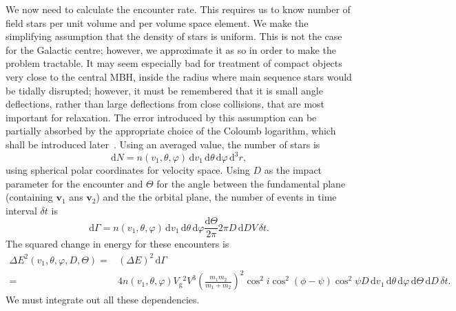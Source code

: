 \documentclass[useAMS,usedcolumn,usegraphicx,usenatbib]{mn2e}
\newcommand{\sub}[1]{\ensuremath{_\mathrm{#1}}}
\newcommand{\dd}{\ensuremath{\mathrm{d}}}
\begin{document}
\begin{onecolumn}
We now need to calculate the encounter rate. This requires us to know number of field stars per unit volume and per volume space element. We make the simplifying assumption that the density of stars is uniform. This is not the case for the Galactic centre; however, we approximate it as so in order to make the problem tractable. It may seem especially bad for treatment of compact objects very close to the central MBH, inside the radius where main sequence stars would be tidally disrupted; however, it must be remembered that it is small angle deflections, rather than large deflections from close collisions, that are most important for relaxation. The error introduced by this assumption can be partially absorbed by the appropriate choice of the Coloumb logarithm, which shall be introduced later~\citep{Just2011}. Using an averaged value, the number of stars is
\begin{equation}
\dd N = n(v_1, \theta, \varphi)\,\dd v_1 \,\dd \theta \,\dd \varphi \,\dd^3r,
\end{equation}
using spherical polar coordinates for velocity space. Using $D$ as the impact parameter for the encounter and $\Theta$ for the angle between the fundamental plane (containing $\boldsymbol{v}_1$ ans $\boldsymbol{v}_2$) and the the orbital plane, the number of events in time interval $\delta t$ is
\begin{equation}
\dd \Gamma =  n(v_1, \theta, \varphi)\,\dd v_1 \,\dd \theta \,\dd \varphi \frac{\dd \Theta}{2\pi} 2\pi D \,\dd D V \,\delta t.
\end{equation}
The squared change in energy for these encounters is
\begin{align}
\Delta E^2(v_1,\theta,\varphi,D,\Theta) = {} & \left(\Delta E\right)^2\,\dd \Gamma\\
 = {} & 4 n(v_1,\theta,\varphi)V\sub{g}^2V^3\left(\frac{m_1m_2}{m_1+m_2}\right)^2\cos^2i\cos^2(\phi-\psi)\cos^2\psi D\,\dd v_1\,\dd\theta\,\dd\varphi\,\dd\Theta\,\dd D\,\delta t.
\end{align}
We must integrate out all these dependencies.


\end{onecolumn}
\end{document}
